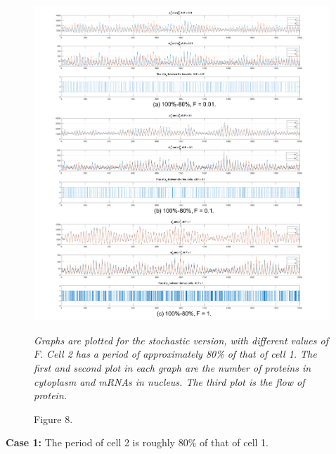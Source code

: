 \documentclass[12pt]{article}
\renewcommand{\(}{\left (}
\renewcommand{\)}{\right )}
\begin{document}
 \begin{figure}[!]
    \centering
	\begin{minipage}{0.99\textwidth}
		\centering
		\includegraphics[width=0.99\textwidth]{sto_two_80_100_compare.png}
		\caption*{\small Figure 8.}
	\end{minipage}
	\footnotesize
	\emph{Graphs are plotted for the stochastic version, with different values of $F.$ Cell 2 has a period of approximately 80\% of that of cell 1. The first and second plot in each graph are the number of proteins in cytoplasm and mRNAs in nucleus. The third plot is the flow of protein.}
\end{figure}

\textbf{Case 1:} The period of cell 2 is roughly 80\% of that of cell 1.
\end{document}
